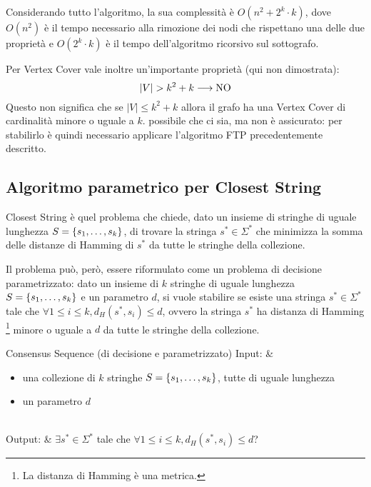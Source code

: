 Considerando tutto l'algoritmo, la sua complessità è $O(n^2 + 2^k \cdot k)$,
dove $O(n^2)$ è il tempo necessario alla rimozione dei nodi che rispettano
una delle due proprietà e $O(2^k \cdot k)$ è il tempo dell'algoritmo
ricorsivo sul sottografo.

Per Vertex Cover vale inoltre un'importante proprietà (qui non dimostrata):
\[
    |V| > k^2 + k \longrightarrow \textnormal{NO}
\]
Questo non significa che se $|V| \le k^2 + k$ allora il grafo ha una Vertex
Cover di cardinalità minore o uguale a $k$. \upperAccE possibile che ci sia,
ma non è assicurato: per stabilirlo è quindi necessario applicare
l'algoritmo FTP precedentemente descritto.


\subsection*{Algoritmo parametrico per Closest String}
Closest String è quel problema che chiede, dato un insieme di stringhe
di uguale lunghezza $S = \left\{s_1, \ldots, s_k\right\}$, di trovare la stringa
$s^* \in \Sigma^*$ che minimizza la somma delle distanze di Hamming di $s^*$
da tutte le stringhe della collezione.

Il problema può, però, essere riformulato come un problema di decisione
parametrizzato: dato un insieme di $k$ stringhe di uguale lunghezza
$S = \left\{s_1, \ldots, s_k\right\}$ e un parametro $d$, si vuole stabilire
se esiste una stringa
$s^* \in \Sigma^*$ tale che $\forall 1 \le i \le k, d_H(s^*, s_i) \le d$,
ovvero la stringa $s^*$ ha distanza di Hamming \footnote{La distanza
di Hamming è una metrica.} minore o uguale a $d$ da tutte le
stringhe della collezione.

\begin{problem}[lined]{Consensus Sequence (di decisione e parametrizzato)}
    Input: & \begin{minipage}[t]{0.8\linewidth}\begin{itemize}
        \setlength\itemsep{0em}
        \item una collezione di $k$ stringhe $S = \left\{s_1, \ldots, s_k\right\}$,
        tutte di uguale lunghezza
        \item un parametro $d$
    \end{itemize}\end{minipage}\\
    Output: & $\exists s^* \in \Sigma^*$ tale che
    $\forall 1 \le i \le k, d_H(s^*, s_i) \le d$?
\end{problem}

